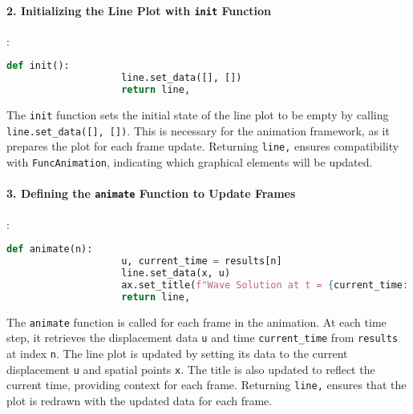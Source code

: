 \documentclass{article}
\begin{document}
			\paragraph{2. Initializing the Line Plot with \texttt{init} Function}
			:
			\begin{lstlisting}[language=Python]
				def init():
					line.set_data([], [])
					return line,
			\end{lstlisting}
			The \texttt{init} function sets the initial state of the line plot to be empty by calling \texttt{line.set\_data([], [])}. This is necessary for the animation framework, as it prepares the plot for each frame update. Returning \texttt{line,} ensures compatibility with \texttt{FuncAnimation}, indicating which graphical elements will be updated.
			
			\paragraph{3. Defining the \texttt{animate} Function to Update Frames}
			:
			\begin{lstlisting}[language=Python]
				def animate(n):
					u, current_time = results[n]
					line.set_data(x, u)
					ax.set_title(f"Wave Solution at t = {current_time:.3f}")
					return line,
			\end{lstlisting}
			The \texttt{animate} function is called for each frame in the animation. At each time step, it retrieves the displacement data \texttt{u} and time \texttt{current\_time} from \texttt{results} at index \texttt{n}. The line plot is updated by setting its data to the current displacement \texttt{u} and spatial points \texttt{x}. The title is also updated to reflect the current time, providing context for each frame. Returning \texttt{line,} ensures that the plot is redrawn with the updated data for each frame.
			
\end{document}
